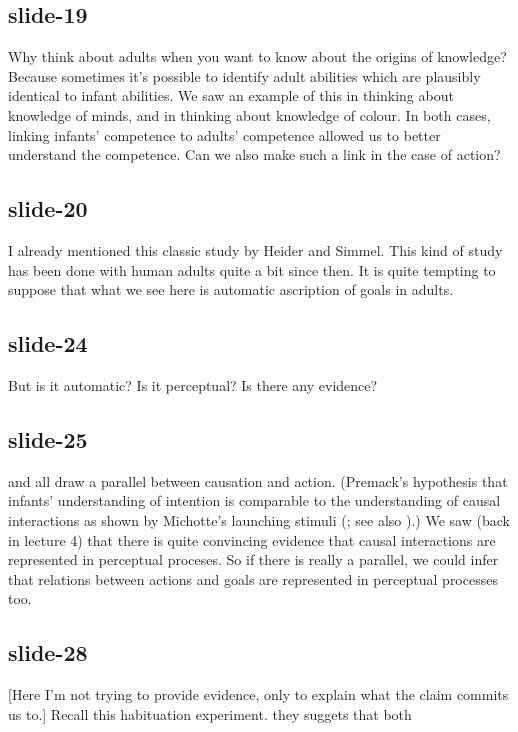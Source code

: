 \documentclass[12pt,\papersize]{extarticle}
\begin{document}
 
\subsection{slide-19}
Why think about adults when you want to know about the origins of knowledge?
Because sometimes it's possible to identify adult abilities which are plausibly identical to infant abilities.
We saw an example of this in thinking about knowledge of minds, and in thinking about knowledge of colour.
In both cases, linking infants' competence to adults' competence allowed us to better understand the competence.
Can we also make such a link in the case of action?
 
 
\subsection{slide-20}
I already mentioned this classic study by Heider and Simmel.
This kind of study has been done with human adults quite a bit since then.
It is quite tempting to suppose that what we see here is automatic ascription of goals in adults.
 
 
\subsection{slide-24}
But is it automatic? Is it perceptual? Is there any evidence?
 
 
\subsection{slide-25}
\citet{Premack:1990jl} and \citet{Scholl:2000eq} all draw a parallel between causation and action.
(Premack's hypothesis that infants' understanding of intention is comparable to the understanding of causal interactions as shown by Michotte's launching stimuli (\citep{Premack:1990jl}; see also \citep{Premack:1997ek}).)
We saw (back in lecture 4) that there is quite convincing evidence that causal interactions are represented in perceptual proceses.
So if there is really a parallel, we could infer that relations between actions and goals are represented in perceptual processes too.
 
 
\subsection{slide-28}
[Here I'm not trying to provide evidence, only to explain what the claim commits us to.]
Recall this habituation experiment.
they suggets that both
 
\end{document}
